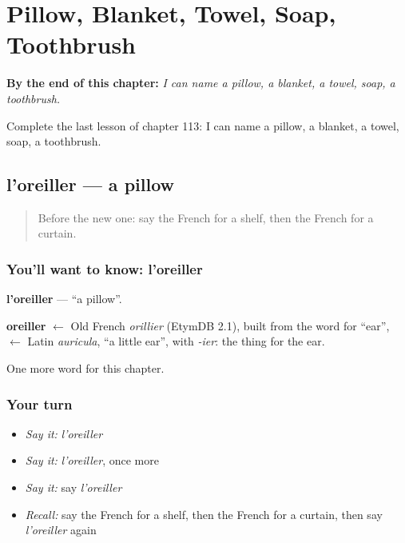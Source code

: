 
\chapter{Pillow, Blanket, Towel, Soap, Toothbrush}
\label{ch:fr-pillow-blanket-towel-soap-toothbrush}

\begin{chapteropening}
\textbf{By the end of this chapter:} \emph{I can name a pillow, a blanket, a towel, soap, a toothbrush.}

Complete the last lesson of chapter 113: I can name a pillow, a blanket, a towel, soap, a toothbrush.
\end{chapteropening}

\section[l'oreiller]{l'oreiller — a pillow}

\label{lesson:FR-C113-oreiller}



\begin{quote}
Before the new one: say the French for a shelf, then the French for a curtain.
\end{quote}

\subsection*{You'll want to know: l'oreiller}
\textbf{l'oreiller} — \textquotedblleft{}a pillow\textquotedblright{}.

\begin{cousinweb}
\textbf{oreiller} $\leftarrow$ Old French \emph{orillier} (EtymDB 2.1), built from the word for \textquotedblleft{}ear\textquotedblright{}, $\leftarrow$ Latin \emph{auricula}, \textquotedblleft{}a little ear\textquotedblright{}, with \emph{-ier}: the thing for the ear.
\end{cousinweb}

\begin{grammarlens}[title={What you've built}]
One more word for this chapter.
\end{grammarlens}

\subsection*{Your turn}
\begin{itemize}
\raggedright
  \item \emph{Say it:} \emph{l'oreiller}
  \item \emph{Say it:} \emph{l'oreiller}, once more
  \item \emph{Say it:} say \emph{l'oreiller}
  \item \emph{Recall:} say the French for a shelf, then the French for a curtain, then say \emph{l'oreiller} again
\end{itemize}

